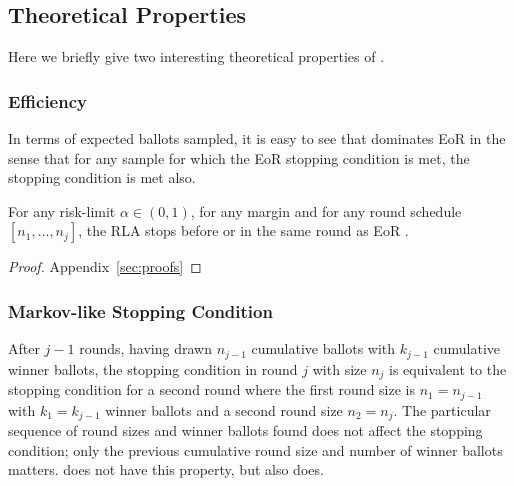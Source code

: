 % 





% 

\subsection{Theoretical Properties}
Here we briefly give two interesting theoretical properties of \Providence.

\subsubsection{Efficiency}
In terms of expected ballots sampled, it is easy to see that \Providence dominates EoR \BRAVO in the sense that for any sample for which the EoR \BRAVO stopping condition is met, the \Providence stopping condition is met also.
\begin{lemma}
\label{lem:efficiency}
For any risk-limit $\alpha \in (0, 1)$, for any margin
and for any round schedule $[n_1, \ldots, n_j]$, 
the \Providence RLA stops before or in the same round as EoR \BRAVO.
\end{lemma}
\begin{proof} Appendix~\ref{sec:proofs}\end{proof}

\subsubsection{Markov-like Stopping Condition}
After $j-1$ rounds, having drawn $n_{j-1}$ cumulative ballots with $k_{j-1}$ cumulative winner ballots, the \Providence stopping condition in round $j$ with size $n_j$ is equivalent to the \Providence stopping condition for a second round where the first round size is $n_1=n_{j-1}$ with $k_1=k_{j-1}$ winner ballots and a second round size $n_2=n_j$. The particular sequence of round sizes and winner ballots found does not affect the \Providence stopping condition; only the previous cumulative round size and number of winner ballots matters. \Minerva does not have this property, but \BRAVO also does.

